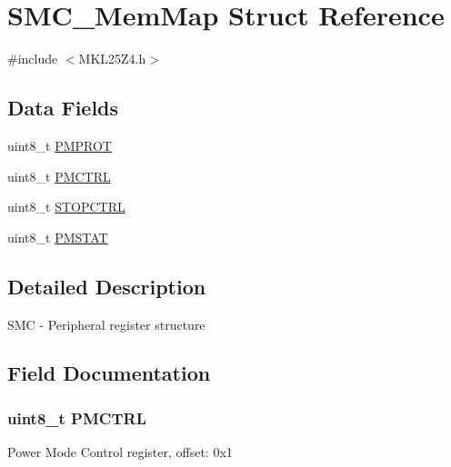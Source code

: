 \hypertarget{struct_s_m_c___mem_map}{}\section{S\+M\+C\+\_\+\+Mem\+Map Struct Reference}
\label{struct_s_m_c___mem_map}


{\ttfamily \#include $<$M\+K\+L25\+Z4.\+h$>$}

\subsection*{Data Fields}
\begin{DoxyCompactItemize}
\item 
uint8\+\_\+t \hyperlink{struct_s_m_c___mem_map_a0e48ca7c949ba2fd2f9a29f153ee1245}{P\+M\+P\+R\+O\+T}
\item 
uint8\+\_\+t \hyperlink{struct_s_m_c___mem_map_acc989af655daf69d506fde822f207e0c}{P\+M\+C\+T\+R\+L}
\item 
uint8\+\_\+t \hyperlink{struct_s_m_c___mem_map_a2873244428756490bbc28c84e2161d73}{S\+T\+O\+P\+C\+T\+R\+L}
\item 
uint8\+\_\+t \hyperlink{struct_s_m_c___mem_map_adacbe2d7cc2808682b7b83e091b850a8}{P\+M\+S\+T\+A\+T}
\end{DoxyCompactItemize}


\subsection{Detailed Description}
S\+M\+C -\/ Peripheral register structure 

\subsection{Field Documentation}
\hypertarget{struct_s_m_c___mem_map_acc989af655daf69d506fde822f207e0c}{}
\subsubsection[{P\+M\+C\+T\+R\+L}]{\setlength{\rightskip}{0pt plus 5cm}uint8\+\_\+t P\+M\+C\+T\+R\+L}\label{struct_s_m_c___mem_map_acc989af655daf69d506fde822f207e0c}
Power Mode Control register, offset\+: 0x1 \hypertarget{struct_s_m_c___mem_map_a0e48ca7c949ba2fd2f9a29f153ee1245}{}
